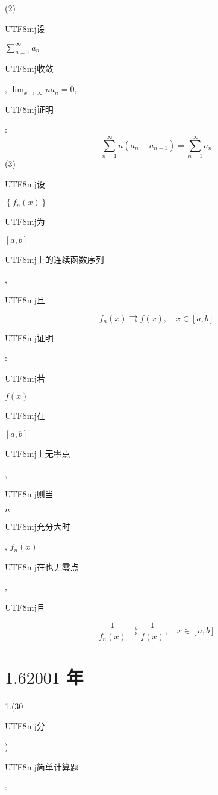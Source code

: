 \documentclass[10pt]{article}
\begin{document}
(2) \begin{CJK}{UTF8}{mj}设\end{CJK} $\sum_{n=1}^{\infty} a_{n}$ \begin{CJK}{UTF8}{mj}收敛\end{CJK}, $\lim _{x \rightarrow \infty} n a_{n}=0$, \begin{CJK}{UTF8}{mj}证明\end{CJK}:
$$
\sum_{n=1}^{\infty} n\left(a_{n}-a_{n+1}\right)=\sum_{n=1}^{\infty} a_{n}
$$
(3) \begin{CJK}{UTF8}{mj}设\end{CJK} $\left\{f_{n}(x)\right\}$ \begin{CJK}{UTF8}{mj}为\end{CJK} $[a, b]$ \begin{CJK}{UTF8}{mj}上的连续函数序列\end{CJK}, \begin{CJK}{UTF8}{mj}且\end{CJK}
$$
f_{n}(x) \rightrightarrows f(x), \quad x \in[a, b]
$$
\begin{CJK}{UTF8}{mj}证明\end{CJK}: \begin{CJK}{UTF8}{mj}若\end{CJK} $f(x)$ \begin{CJK}{UTF8}{mj}在\end{CJK} $[a, b]$ \begin{CJK}{UTF8}{mj}上无零点\end{CJK}, \begin{CJK}{UTF8}{mj}则当\end{CJK} $n$ \begin{CJK}{UTF8}{mj}充分大时\end{CJK}, $f_{n}(x)$ \begin{CJK}{UTF8}{mj}在也无零点\end{CJK}, \begin{CJK}{UTF8}{mj}且\end{CJK}
$$
\frac{1}{f_{n}(x)} \rightrightarrows \frac{1}{f(x)}, \quad x \in[a, b]
$$

\section{$1.62001$ 年}
1.(30 \begin{CJK}{UTF8}{mj}分\end{CJK}) \begin{CJK}{UTF8}{mj}简单计算题\end{CJK}:
\end{document}
